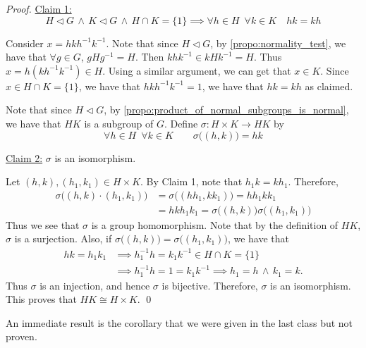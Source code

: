 \begin{proof}
  \underline{Claim 1:}
  \begin{equation*}
    H \triangleleft G \, \land \, K \triangleleft G \, \land \, H \cap K = \{1\} \implies \forall h \in H \enspace \forall k \in K \quad hk = kh
  \end{equation*}

  Consider $x = hkh^{-1}k^{-1}$. Note that since $H \triangleleft G$, by \cref{propo:normality_test}, we have that $\forall g \in G$, $gHg^{-1} = H$. Then $khk^{-1} \in kHk^{-1} = H$. Thus $x = h(kh^{-1}k^{-1}) \in H$. Using a similar argument, we can get that $x \in K$. Since $x \in H \cap K = \{1\}$, we have that $hkh^{-1}k^{-1} = 1$, we have that $hk = kh$ as claimed.

  Note that since $H \triangleleft G$, by \cref{propo:product_of_normal_subgroups_is_normal}, we have that $HK$ is a subgroup of $G$. Define $\sigma : H \times K \to HK$ by
  \begin{equation*}
    \forall h \in H \enspace \forall k \in K \qquad \sigma\big( (h, k) \big) = hk
  \end{equation*}

  \noindent\underline{Claim 2:} $\sigma$ is an isomorphism.

  Let $(h, k), (h_1, k_1) \in H \times K$. By Claim 1, note that $h_1 k = kh_1$. Therefore,
  \begin{align*}
    \sigma\big( (h, k)\cdot(h_1, k_1) \big)
      &= \sigma\big( (hh_1, kk_1) \big) = hh_1 kk_1 \\
      &= hkh_1k_1 = \sigma\big( (h, k) \big) \sigma\big( (h_1, k_1) \big)
  \end{align*}
  Thus we see that $\sigma$ is a group homomorphism. Note that by the definition of $HK$, $\sigma$ is a surjection. Also, if $\sigma\big( (h, k) \big) = \sigma\big( (h_1, k_1) \big)$, we have that
  \begin{align*}
    hk = h_1 k_1 &\implies h_1^{-1} h = k_1 k^{-1} \in H \cap K = \{ 1 \} \\
      &\implies h_1^{-1} h = 1 = k_1 k^{-1} \implies h_1 = h \, \land \, k_1 = k.
  \end{align*}
  Thus $\sigma$ is an injection, and hence $\sigma$ is bijective. Therefore, $\sigma$ is an isomorphism. This proves that $HK \cong H \times K$. \qed
\end{proof}

An immediate result is the corollary that we were given in the last class but not proven.


